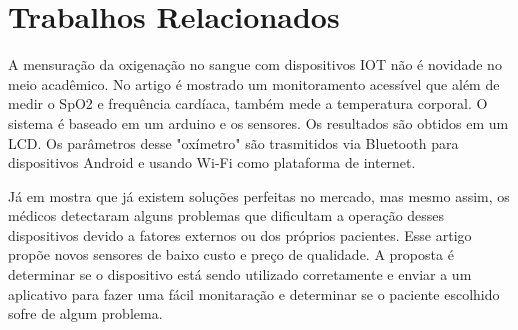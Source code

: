 
\section{Trabalhos Relacionados} \label{sec:related}

A mensuração da oxigenação no sangue com dispositivos IOT não é novidade no meio acadêmico. No artigo \cite{trabalho1} é mostrado um monitoramento acessível que além de medir o SpO2 e frequência cardíaca, também mede a temperatura corporal. O sistema é baseado em um arduino e os sensores. Os resultados são obtidos em um LCD. Os parâmetros desse "oxímetro" são trasmitidos via Bluetooth para dispositivos Android e usando Wi-Fi como plataforma de internet.

Já em \cite{10783228} mostra que já existem soluções perfeitas no mercado, mas mesmo assim, os médicos detectaram alguns problemas que dificultam a operação desses dispositivos devido a fatores externos ou dos próprios pacientes. Esse artigo propõe novos sensores de baixo custo e preço de qualidade. A proposta é determinar se o dispositivo está sendo utilizado corretamente e enviar a um aplicativo para fazer uma fácil monitaração e determinar se o paciente escolhido sofre de algum problema.